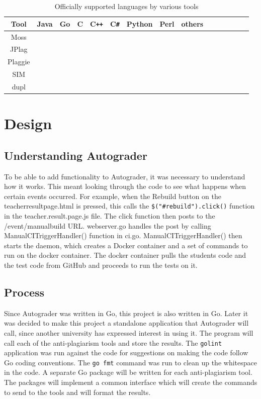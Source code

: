 \documentclass[12pt]{article}
\begin{document}
			\begin{table}[h!]
				\begin{center}
					\caption{Officially supported languages by various tools}
					\label{tab:languageSupport}
					\begin{tabular}{ccccccccccccccc}
						\toprule
						Tool & Java & Go & C & C\verb!++! & C\verb!#! & Python & Perl & others\\
						\midrule
						Moss & \checkmark & & \checkmark & \checkmark & \checkmark & \checkmark & \checkmark & \checkmark \\
						JPlag & \checkmark & & \checkmark & \checkmark & \checkmark & & & \checkmark\\
						Plaggie & \checkmark & & & & & & & \\
						SIM & \checkmark & & \checkmark & & & & & \checkmark\\
						dupl & & \checkmark & & & & & & \\
						\bottomrule
					\end{tabular}
				\end{center}
			\end{table}
		
	\section{Design}
		\subsection{Understanding Autograder}
			To be able to add functionality to Autograder, it was necessary to understand how it works. This meant looking through the code to see what happens when certain events occurred. For example, when the Rebuild button on the teacherresultpage.html is pressed, this calls the \verb|$("#rebuild").click()| function in the teacher.result.page.js file. The click function then posts to the /event/manualbuild URL. webserver.go handles the post by calling ManualCITriggerHandler() function in ci.go. ManualCITriggerHandler() then starts the daemon, which creates a Docker container and a set of commands to run on the docker container. The docker container pulls the students code and the test code from GitHub and proceeds to run the tests on it.	
			
		\subsection{Process}
			Since Autograder was written in Go, this project is also written in Go. Later it was decided to make this project a standalone application that Autograder will call, since another university has expressed interest in using it. The program will call each of the anti-plagiarism tools and store the results. The \verb|golint| application was run against the code for suggestions on making the code follow Go coding conventions. The \verb|go fmt| command was run to clean up the whitespace in the code. A separate Go package will be written for each anti-plagiarism tool. The packages will implement a common interface which will create the commands to send to the tools and will format the results.
			
\end{document}
